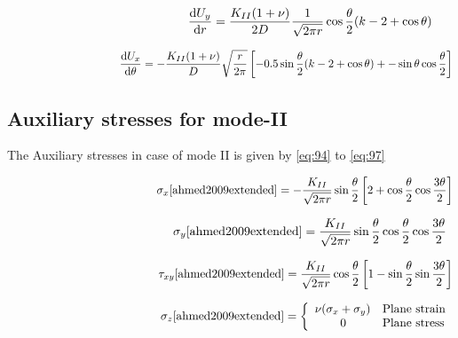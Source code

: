 \documentclass[fleqn, 12.5pt,a4paper]{report}
\newcommand\tab[1][1cm]{\hspace*{#1}}
\begin{document}
\begin{align}\label{eq:92}\hspace{4.5cm}
\dv{U_y}{r} = \frac{K_{II}(1+\nu)}{2D} \frac{1}{\sqrt{2\pi r}} \cos\frac{\theta}{2} (k-2+\cos\theta)
\end{align}

\begin{align}\label{eq:93}\hspace{3.5cm}
\dv{U_x}{\theta} = -\frac{K_{II}(1+\nu)}{D} \sqrt{\frac{r}{2\pi}} \left[-0.5\sin\frac{\theta}{2} (k-2+\cos\theta) +- \sin\theta \cos\frac{\theta}{2} \right]
\end{align}

\subsection{Auxiliary stresses for mode-II}
The Auxiliary stresses in case of mode II is given by \autoref{eq:94} to \autoref{eq:97} \cite{khoei2014extended}

\begin{align}\label{eq:94}\hspace{4.5cm}
\sigma_{x}\cite{ahmed2009extended} = -\frac{K_{II}}{\sqrt{2\pi r}} \sin\frac{\theta}{2} \left[2+\cos\frac{\theta}{2} \cos\frac{3\theta}{2}\right]
\end{align}

\begin{align}\label{eq:95}\hspace{4.5cm}
\sigma_{y}\cite{ahmed2009extended} = \frac{K_{II}}{\sqrt{2\pi r}} \sin\frac{\theta}{2} \cos\frac{\theta}{2} \cos\frac{3\theta}{2}
\end{align}

\begin{align}\label{eq:96}\hspace{4.5cm}
\tau_{xy}\cite{ahmed2009extended} = \frac{K_{II}}{\sqrt{2\pi r}} \cos\frac{\theta}{2} \left[1-\sin\frac{\theta}{2} \sin\frac{3\theta}{2}\right]
\end{align}

\begin{align}\label{eq:97}\hspace{4.5cm}
\sigma_{z}\cite{ahmed2009extended} = 
\left\{
\begin{array}{ll}
\nu(\sigma_x + \sigma_y) & \mbox{Plane strain}\\
\tab[0.75cm] 0 & \mbox{Plane stress}\\
\end{array}
\right.
\end{align}
\end{document}
